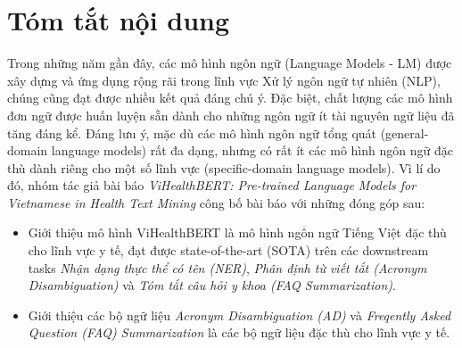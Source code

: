\section{Tóm tắt nội dung}
Trong những năm gần đây, các mô hình ngôn ngữ (Language Models - LM) được xây dựng và ứng dụng rộng rãi trong lĩnh vực Xử lý ngôn ngữ tự nhiên (NLP), chúng cũng đạt được nhiều kết quả đáng chú ý. Đặc biệt, chất lượng các mô hình đơn ngữ được huấn luyện sẵn dành cho những ngôn ngữ ít tài nguyên ngữ liệu đã tăng đáng kể. Đáng lưu ý, mặc dù các mô hình ngôn ngữ tổng quát (general-domain language models) rất đa dạng, nhưng có rất ít các mô hình ngôn ngữ đặc thù dành riêng cho một số lĩnh vực (specific-domain language models). Vì lí do đó, nhóm tác giả bài báo \textit{ViHealthBERT: Pre-trained Language Models for Vietnamese in Health Text Mining}\cite{minh-EtAl:2022:LREC} công bố bài báo với những đóng góp sau:
\begin{itemize}
\item Giới thiệu mô hình ViHealthBERT là mô hình ngôn ngữ Tiếng Việt đặc thù cho lĩnh vực y tế, đạt được state-of-the-art (SOTA) trên các downstream tasks \textit{Nhận dạng thực thể có tên (NER)}, \textit{Phân định từ viết tắt (Acronym Disambiguation)} và \textit{Tóm tắt câu hỏi y khoa (FAQ Summarization)}.
\item Giới thiệu các bộ ngữ liệu \textit{Acronym Disambiguation (AD)} và \textit{Freqently Asked Question (FAQ) Summarization} là các bộ ngữ liệu đặc thù cho lĩnh vực y tế.
\end{itemize}
